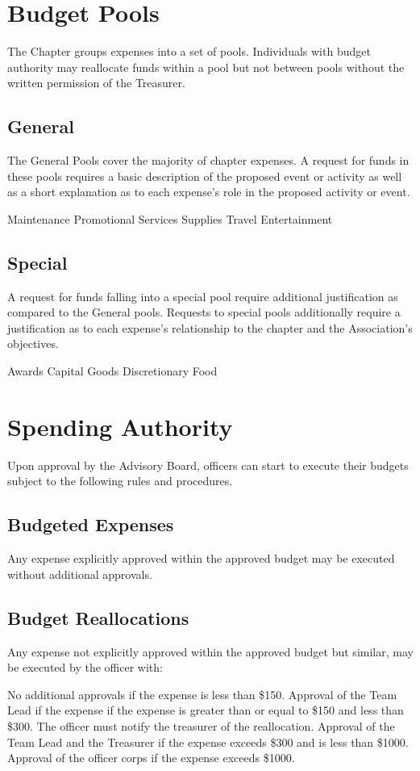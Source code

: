 \documentclass[bylaws,final,10pt,withoutoptional,withoutpreface,officerdoc]{../bylaws}
\begin{document}
\chapter{Budget Pools}\label{sec:pools}
The Chapter groups expenses into a set of pools. Individuals with budget authority may reallocate funds within a pool but not between pools without the written permission of the Treasurer.
\section{General} The General Pools cover the majority of chapter expenses. A request for funds in these pools requires a basic description of the proposed event or activity as well as a short explanation as to each expense's role in the proposed activity or event.
\begin{enumsubsection}
\itemnotoc Maintenance 
\itemnotoc Promotional
\itemnotoc Services
\itemnotoc Supplies
\itemnotoc Travel
\itemnotoc Entertainment
\end{enumsubsection}

\section{Special} A request for funds falling into a special pool require additional justification as compared to the General pools. Requests to special pools additionally require a justification as to each expense's relationship to the chapter and the Association's objectives.
\begin{enumsubsection}
\itemnotoc Awards
\itemnotoc Capital Goods
\itemnotoc Discretionary
\itemnotoc Food 
\end{enumsubsection}


\chapter{Spending Authority}\label{sec:authority}
Upon approval by the Advisory Board, officers can start to execute their budgets subject to the following rules and procedures.
\section{Budgeted Expenses} Any expense explicitly approved within the approved budget may be executed without additional approvals.
\section{Budget Reallocations} Any expense not explicitly approved within the approved budget but similar, may be executed by the officer with:
 \begin{enumsubsection}\label{sec:reallocations}
 	\itemnotoc No additional approvals if the expense is less than \$150. 
	\itemnotoc Approval of the Team Lead if the expense if the expense is greater than or equal to \$150 and less than \$300. The officer must notify the treasurer of the reallocation.
	\itemnotoc Approval of the Team Lead and the Treasurer if the expense exceeds \$300 and is less than \$1000.
	\itemnotoc Approval of the officer corps if the expense exceeds \$1000.
\end{enumsubsection}
\end{document}
